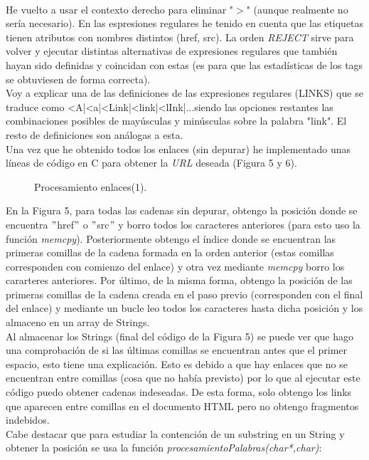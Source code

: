 \documentclass[10pt, a4paper,spanish]{article}
\begin{document}
\noindent \\ He vuelto a usar el contexto derecho para eliminar "$>$" (aunque realmente no sería necesario). En las espresiones regulares he tenido en cuenta que las etiquetas tienen atributos con nombres distintos (href, src). La orden \textit{REJECT} sirve para volver y ejecutar distintas alternativas de expresiones regulares que también hayan sido definidas y coincidan con estas (es para que las estadísticas de los tags se obtuviesen de forma correcta). \\
Voy a explicar una de las definiciones de las expresiones regulares (LINKS) que se traduce como <A|<a|<Link|<link|<lInk|...siendo las opciones restantes las combinaciones posibles de mayúsculas y minúsculas sobre la palabra "link". El resto de definiciones son análogas a esta.\\  
Una vez que he obtenido todos los enlaces (sin depurar) he implementado unas líneas de código en C para obtener la \textit{URL} deseada (Figura 5 y 6). 
\bigskip
\begin{figure}[H]
  \centering
  \caption{Procesamiento enlaces(1).}
\end{figure}
\bigskip
\noindent En la Figura 5, para todas las cadenas sin depurar, obtengo la posición donde se encuentra $"$href$"$ o $"$src$"$ y borro todos los caracteres anteriores (para esto uso la función \textit{memcpy}). Posteriormente obtengo el índice donde se encuentran las primeras comillas de la cadena formada en la orden anterior (estas comillas corresponden con comienzo del enlace) y otra vez mediante \textit{memcpy} borro los cararteres anteriores. Por último, de la misma forma, obtengo la posición de las primeras comillas de la cadena creada en el paso previo (corresponden con el final del enlace) y mediante un bucle leo todos los caracteres hasta dicha posición y los almaceno en un array de Strings.\\ Al almacenar los Strings (final del código de la Figura 5) se puede ver que hago una comprobación de si las últimas comillas se encuentran antes que el primer espacio, esto tiene una explicación. Esto es debido a que hay enlaces que no se encuentran entre comillas (cosa que no había previsto) por lo que al ejecutar este código puedo obtener cadenas indeseadas. De esta forma, solo obtengo los links que aparecen entre comillas en el documento HTML pero no obtengo fragmentos indebidos.  
\\ 
\newpage
\noindent Cabe destacar que para estudiar la contención de un substring en un String y obtener la posición se usa la función \textit{procesamientoPalabras(char*,char)}:
\end{document}

